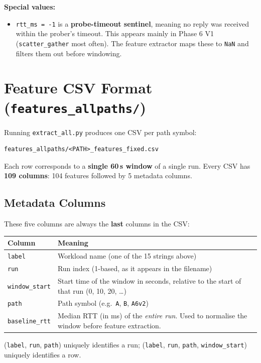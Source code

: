 \documentclass[11pt,a4paper]{article}
\begin{document}
\textbf{Special values:}
\begin{itemize}[leftmargin=*]
  \item \texttt{rtt\_ms = -1} is a \textbf{probe-timeout sentinel}, meaning
        no reply was received within the prober's timeout. This appears
        mainly in Phase 6 V1 (\texttt{scatter\_gather} most often). The
        feature extractor maps these to \texttt{NaN} and filters them out
        before windowing.
\end{itemize}

\section{Feature CSV Format (\texttt{features\_allpaths/})}

Running \texttt{extract\_all.py} produces one CSV per path symbol:
\begin{lstlisting}
features_allpaths/<PATH>_features_fixed.csv
\end{lstlisting}

Each row corresponds to a \textbf{single 60\,s window} of a single run. Every
CSV has \textbf{109 columns}: 104 features followed by 5 metadata columns.

\subsection{Metadata Columns}

These five columns are always the \textbf{last} columns in the CSV:

\begin{tabular}{@{}lp{10cm}@{}}
\toprule
\textbf{Column}   & \textbf{Meaning} \\
\midrule
\texttt{label}        & Workload name (one of the 15 strings above) \\
\texttt{run}          & Run index (1-based, as it appears in the filename) \\
\texttt{window\_start}& Start time of the window in seconds, relative to the start of that run (0, 10, 20, \ldots) \\
\texttt{path}         & Path symbol (e.g.\ \texttt{A}, \texttt{B}, \texttt{A6v2}) \\
\texttt{baseline\_rtt}& Median RTT (in ms) of the \emph{entire run}. Used to normalise the window before feature extraction. \\
\bottomrule
\end{tabular}

(\texttt{label}, \texttt{run}, \texttt{path}) uniquely identifies a run;
(\texttt{label}, \texttt{run}, \texttt{path}, \texttt{window\_start}) uniquely
identifies a row.
\end{document}
